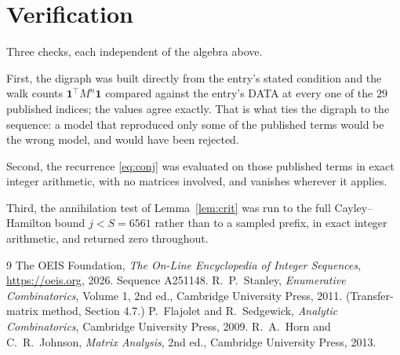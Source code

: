 \documentclass[11pt,a4paper]{article}
\theoremstyle{plain}
\theoremstyle{definition}
\begin{document}
\section{Verification}

Three checks, each independent of the algebra above.

First, the digraph was built directly from the entry's stated condition and the walk counts
$\mathbf{1}^{\!\top}M^{n}\mathbf{1}$ compared against the entry's DATA at every one of
the $29$ published indices; the values agree exactly. That is what ties the digraph to
the sequence: a model that reproduced only some of the published terms would be the wrong
model, and would have been rejected.

Second, the recurrence \eqref{eq:conj} was evaluated on those published terms in exact
integer arithmetic, with no matrices involved, and vanishes wherever it applies.

Third, the annihilation test of Lemma~\ref{lem:crit} was run to the full Cayley--Hamilton
bound $j<S=6561$ rather than to a sampled prefix, in exact integer arithmetic, and returned
zero throughout.

\begin{thebibliography}{9}
 The OEIS Foundation, \emph{The On-Line Encyclopedia of Integer
Sequences}, \url{https://oeis.org}, 2026. Sequence A251148.
 R.~P.~Stanley, \emph{Enumerative Combinatorics}, Volume 1, 2nd ed.,
Cambridge University Press, 2011. (Transfer-matrix method, Section 4.7.)
 P.~Flajolet and R.~Sedgewick, \emph{Analytic Combinatorics}, Cambridge
University Press, 2009.
 R.~A.~Horn and C.~R.~Johnson, \emph{Matrix Analysis}, 2nd ed., Cambridge
University Press, 2013.
\end{thebibliography}
\end{document}
